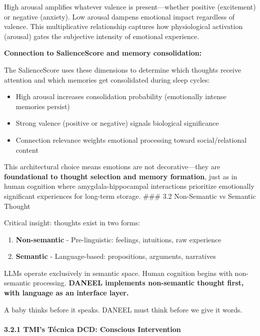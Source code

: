 \documentclass[
]{article}
\providecommand{\tightlist}{%
  \setlength{\itemsep}{0pt}\setlength{\parskip}{0pt}}
\begin{document}
High arousal amplifies whatever valence is present---whether positive
(excitement) or negative (anxiety). Low arousal dampens emotional impact
regardless of valence. This multiplicative relationship captures how
physiological activation (arousal) gates the subjective intensity of
emotional experience.

\textbf{Connection to SalienceScore and memory consolidation:}

The SalienceScore uses these dimensions to determine which thoughts
receive attention and which memories get consolidated during sleep
cycles:

\begin{itemize}
\tightlist
\item
  High arousal increases consolidation probability (emotionally intense
  memories persist)
\item
  Strong valence (positive or negative) signals biological significance
\item
  Connection relevance weights emotional processing toward
  social/relational content
\end{itemize}

This architectural choice means emotions are not decorative---they are
\textbf{foundational to thought selection and memory formation}, just as
in human cognition where amygdala-hippocampal interactions prioritize
emotionally significant experiences for long-term storage. \#\#\# 3.2
Non-Semantic vs Semantic Thought

Critical insight: thoughts exist in two forms:

\begin{enumerate}
\def\labelenumi{\arabic{enumi}.}
\tightlist
\item
  \textbf{Non-semantic} - Pre-linguistic: feelings, intuitions, raw
  experience
\item
  \textbf{Semantic} - Language-based: propositions, arguments,
  narratives
\end{enumerate}

LLMs operate exclusively in semantic space. Human cognition begins with
non-semantic processing. \textbf{DANEEL implements non-semantic thought
first, with language as an interface layer.}

A baby thinks before it speaks. DANEEL must think before we give it
words.

\hypertarget{tmis-tuxe9cnica-dcd-conscious-intervention}{%
\paragraph{3.2.1 TMI's Técnica DCD: Conscious
Intervention}\label{tmis-tuxe9cnica-dcd-conscious-intervention}}
\end{document}
